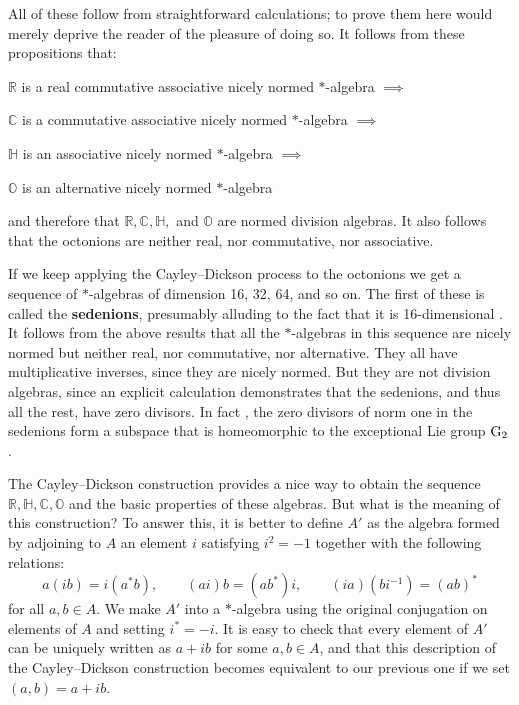 \documentclass[12pt]{article}
\newcommand\R{{\mathbb R}}
\newcommand\C{{\mathbb C}}
\renewcommand\H{{\mathbb H}}
\renewcommand\O{{\mathbb O}}
\newcommand{\G}{{\rm G}}
\newcommand{\be}{\begin{equation}}
\newcommand{\ee}{\end{equation}}
\begin{document}
\noindent All of these follow from straightforward calculations; to   
prove them here would merely deprive the reader of the pleasure of doing   
so.  It follows from these propositions that:   
\begin{center}   
$\R$ is a real commutative associative nicely normed 
$\ast$-algebra $\implies$   
    
$\C$ is a commutative associative nicely normed $\ast$-algebra $\implies$   
   
$\H$ is an associative nicely normed $\ast$-algebra $\implies$   
   
$\O$ is an alternative nicely normed $\ast$-algebra    
\end{center}   
and therefore that $\R,\C,\H,$ and $\O$ are normed division algebras.     
It also follows that the octonions are neither real, nor commutative, nor   
associative.       
   
If we keep applying the Cayley--Dickson process to the octonions we get a   
sequence of $\ast$-algebras of dimension 16, 32, 64, and so on.   The   
first of these is called the {\bf sedenions}, presumably alluding to the   
fact that it is 16-dimensional \cite{LPS}.   It follows from the above   
results that all the $\ast$-algebras in this sequence are nicely normed   
but neither real, nor commutative, nor alternative.  They all have   
multiplicative inverses, since they are nicely normed.  But they are not   
division algebras, since an explicit calculation demonstrates that the   
sedenions, and thus all the rest, have zero divisors.   In fact    
\cite{Cohen,Moreno}, the zero divisors of norm one in the sedenions    
form a subspace that is homeomorphic to the exceptional Lie group $\G_2$.   
   
The Cayley--Dickson construction provides a nice way to obtain the
sequence $\R,\H,\C,\O$ and the basic properties of these algebras.  But
what is the meaning of this construction?  To answer this, it is better
to define $A'$ as the algebra formed by adjoining to $A$ an element $i$
satisfying $i^2 = -1$ together with the following relations:
\be  a(ib) = i(a^* b) ,   \qquad   
    (ai)b = (ab^*)i,      \qquad   
    (ia)(bi^{-1}) = (ab)^*  \label{cd3} \ee   
for all $a,b \in A$.  We make $A'$ into a $\ast$-algebra using the   
original conjugation on elements of $A$ and setting $i^* = -i$.  It is   
easy to check that every element of $A'$ can be uniquely written as $a +   
ib$ for some $a,b \in A$, and that this description of the   
Cayley--Dickson construction becomes equivalent to our previous one    
if we set $(a,b) = a + ib$.     
   
\end{document}
